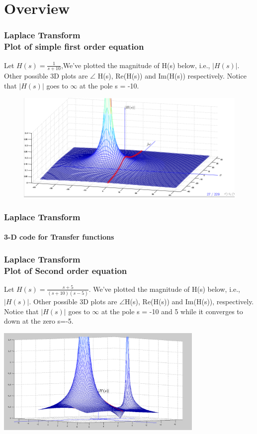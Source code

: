 \documentclass[hyperref={pdfpagelabels=true}]{beamer}
\newcounter{angle}
\begin{document}
\section{Overview}
\begin{frame}
\frametitle{Laplace Transform \\ {\large Plot of simple first order equation}} 
Let $H(s) = \frac{1}{s+10}$,We've plotted the magnitude of H(s) below, i.e., $\vert H(s) \vert$. Other
possible 3D plots are $\angle$ H(s), Re(H(s)) and Im(H(s)) respectively. Notice that $|H(s)|$ goes to $\infty$
at the pole s = -10.
\begin{figure}[!tbp]
\centering
\includegraphics[scale = 0.4]{figs/Selection_016.png}
\end{figure}
\end{frame}





\begin{frame}
\frametitle{Laplace Transform}
\framesubtitle{3-D code for Transfer functions }

\begin{tcolorbox}[title=  ,width=9.85 cm]

\end{tcolorbox}
\end{frame}


\begin{frame}
\frametitle{Laplace Transform \\ {\large Plot of Second order equation}}
Let $H(s) = \frac{s+5}{(s+10)(s-5)}$. We've plotted the magnitude of H(s) below, i.e., $|H(s)|$. Other
possible 3D plots are $\angle$H(s), Re(H(s)) and Im(H(s)), respectively. Notice that $|H(s)|$ goes to $\infty$ at the pole s = -10 and 5 while it converges to down at the zero s=-5. 
 \begin{beamerboxesrounded}[shadow=true]{}
\includegraphics[width=100mm]{figs/Selection_004.png}
\end{beamerboxesrounded}

\end{frame}
\end{document}
